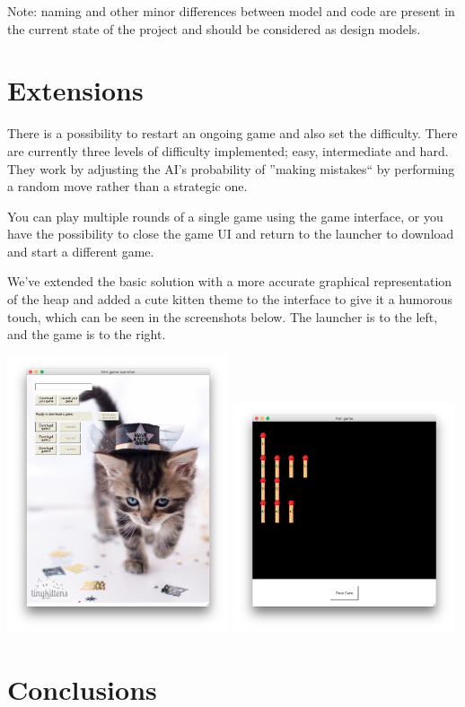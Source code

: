 \documentclass[10pt]{scrartcl}
\begin{document}
Note: naming and other minor differences between model and code are present in the current state of the project and should be considered as design models.
\section{Extensions}
There is a possibility to restart an ongoing game and also set the difficulty. There are currently three levels of difficulty implemented; easy, intermediate and hard. They work by adjusting the AI's probability of ''making mistakes`` by performing a random move rather than a strategic one.

You can play multiple rounds of a single game using the game interface, or you have the possibility to close the game UI and return to the launcher to download and start a different game.

We've extended the basic solution with a more accurate graphical representation of the heap and added a cute kitten theme to the interface to give it a humorous touch, which can be seen in the screenshots below. The launcher is to the left, and the game is to the right.
\begin{center}
\includegraphics[width=0.49\textwidth]{launcher_ui} \includegraphics[width=0.49\textwidth]{game_ui}
\end{center}

\section{Conclusions}



\end{document}
